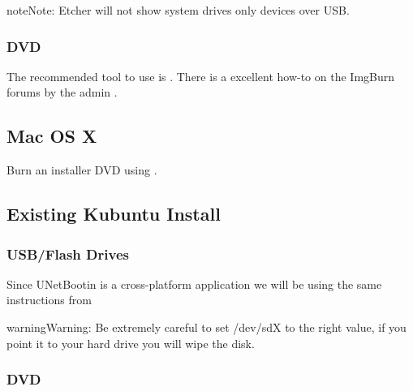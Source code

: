 \documentclass[letterpaper,10pt,english]{sphinxmanual}
\begin{document}
\begin{sphinxadmonition}{note}{Note:}
Etcher will not show system drives only devices over USB.
\end{sphinxadmonition}


\subsubsection{DVD}
\label{\detokenize{docs/installation:dvd}}
The recommended tool to use is . There is a excellent how-to on the ImgBurn forums by the admin .


\subsection{Mac OS X}
\label{\detokenize{docs/installation:mac-os-x}}\label{\detokenize{docs/installation:kubuntu-install-link}}
Burn an installer DVD using .


\subsection{Existing Kubuntu Install}
\label{\detokenize{docs/installation:existing-kubuntu-install}}

\subsubsection{USB/Flash Drives}
\label{\detokenize{docs/installation:id1}}
Since UNetBootin is a cross-platform application we will be using the same instructions from {\hyperref[\detokenize{docs/installation:usb-drives-link}]{}}

\begin{sphinxadmonition}{warning}{Warning:}
Be extremely careful to set /dev/sdX to the right value, if you point it to your hard drive you will wipe the disk.
\end{sphinxadmonition}


\subsubsection{DVD}
\label{\detokenize{docs/installation:id2}}
\end{document}
